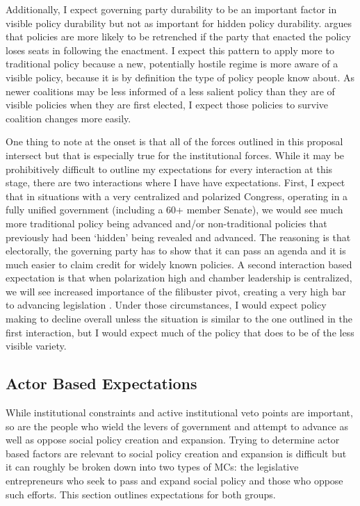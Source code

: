 \documentclass[12pt]{article}
\begin{document}
Additionally, I expect governing party durability to be an important factor in visible policy durability but not as important for hidden policy durability. \citet{berry2012} argues that policies are more likely to be retrenched if the party that enacted the policy loses seats in following the enactment. I expect this pattern to apply more to traditional policy because a new, potentially hostile regime is more aware of a visible policy, because it is by definition the type of policy people know about. As newer coalitions may be less informed of a less salient policy than they are of visible policies when they are first elected, I expect those policies to survive coalition changes more easily. 

One thing to note at the onset is that all of the forces outlined in this proposal intersect but that is especially true for the institutional forces. While it may be prohibitively difficult to outline my expectations for every interaction at this stage, there are two interactions where I have have expectations. First, I expect that in situations with a very centralized and polarized Congress, operating in a fully unified government (including a 60+ member Senate), we would see much more traditional policy being advanced and/or non-traditional policies that previously had been `hidden' being revealed and advanced. The reasoning is that electorally, the governing party has to show that it can pass an agenda and it is much easier to claim credit for widely known policies. A second interaction based expectation is that when polarization high and chamber leadership is centralized, we will see increased importance of the filibuster pivot, creating a very high bar to advancing legislation \citep{koger2010}. Under those circumstances, I would expect policy making to decline overall unless the situation is similar to the one outlined in the first interaction, but I would expect much of the policy that does to be of the less visible variety.

\subsection{Actor Based Expectations}
While institutional constraints and active institutional veto points are important, so are the people who wield the levers of government and attempt to advance as well as oppose social policy creation and expansion. Trying to determine actor based factors are relevant to social policy creation and expansion is difficult but it can roughly be broken down into two types of MCs: the legislative entrepreneurs who seek to pass and expand social policy and those who oppose such efforts. This section outlines expectations for both groups.
\end{document}
